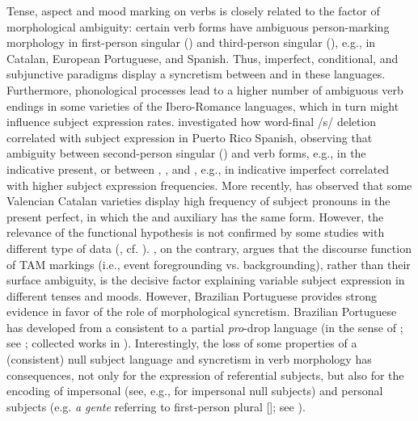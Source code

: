 \documentclass[output=paper]{langscibook}
\begin{document}
Tense, aspect and mood marking on verbs is closely related to the factor of morphological ambiguity: certain verb forms have ambiguous person-marking morphology in first-person singular () and third-person singular (), e.g., in Catalan, European Portuguese, and Spanish. Thus, imperfect, conditional, and subjunctive paradigms display a syncretism between  and  in these languages. Furthermore, phonological processes lead to a higher number of ambiguous verb endings in some varieties of the Ibero-Romance languages, which in turn might influence subject expression rates. \citet{Hochberg1986} investigated how word-final /s/ deletion correlated with subject expression in Puerto Rico Spanish, observing that ambiguity between second-person singular () and  verb forms, e.g., in the indicative present, or between , , and , e.g., in indicative imperfect correlated with higher subject expression frequencies. More recently, \citet{HerbeckForthcoming} has observed that some Valencian Catalan varieties display high frequency of  subject pronouns in the present perfect, in which the  and  auxiliary has the same form. However, the relevance of the functional hypothesis is not confirmed by some studies with different type of data (\citealt{Ranson1991, Cameron1992,Cameron1993}, cf. \citealt[290]{Posio2018}). \citet{Silva-Corvalán2001}, on the contrary, argues that the discourse function of TAM markings (i.e., event foregrounding vs. backgrounding), rather than their surface ambiguity, is the decisive factor explaining variable subject expression in different tenses and moods. However, Brazilian Portuguese provides strong evidence in favor of the role of morphological syncretism. Brazilian Portuguese has developed from a consistent to a partial \textit{pro}-drop language (in the sense of \citealt{Holmberg2005}; see \citealt{Kato1999, Barbosa2009}; collected works in \citealt{KatoNegrão2000}). Interestingly, the loss of some properties of a (consistent) null subject language and syncretism in verb morphology has consequences, not only for the expression of referential subjects, but also for the encoding of impersonal (see, e.g., \citealt{Carvalho2019} for impersonal  null subjects) and personal subjects (e.g. \textit{a gente}  referring to first-person plural []; see \citealt{Lopes2004}).
\end{document}
